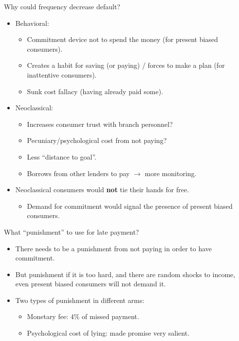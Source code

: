 \documentclass[9pt]{beamer}
\begin{document}
\begin{frame}{Why could frequency decrease default?}
    \begin{itemize}
        \vfill \item Behavioral:
        \begin{itemize}
            \item Commitment device not to spend the money (for present biased consumers).
            \item Creates a habit for saving (or paying) / forces to make a plan (for inattentive consumers).
            \item Sunk cost fallacy (having already paid some).
        \end{itemize}
    \end{itemize}    
    
    \begin{itemize}
        \vfill \item Neoclassical:
        \begin{itemize}    
        \item Increases consumer trust with branch personnel?
        \item Pecuniary/psychological cost from not paying?
        \item Less ``distance to goal''.
         \item Borrows from other lenders to pay $\rightarrow$ more monitoring.
        \end{itemize}
        \vfill
    \item Neoclassical consumers would \textbf{not} tie their hands for free.
        \begin{itemize}
            \item Demand for commitment would signal the presence of present biased consumers.
        \end{itemize}
    \end{itemize}   
    \vfill
\end{frame}


\begin{frame}{What ``punishment'' to use for late payment?}

\begin{itemize}
    \item There needs to be a punishment from not paying in order to have commitment.
    \vfill
    \item But punishment if it is too hard, and there are random shocks to income, even present biased consumers will not demand it.
    \vfill 
    \item Two types of punishment in different arms:
    \begin{itemize}
        \item Monetary fee: $4\%$ of missed payment.
        \item Psychological cost of lying: made promise very salient.
    \end{itemize}
\end{itemize}
    
\end{frame}
\end{document}
